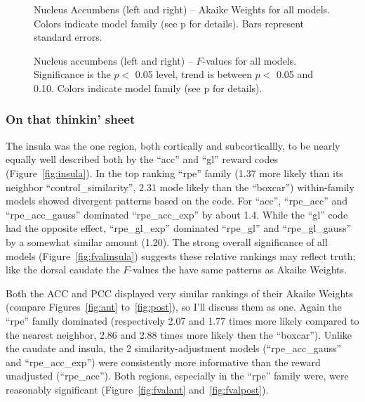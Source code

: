 \documentclass[doc,12pt]{apa}        %
\begin{document}
\begin{figure}[tp]
    \centering
    \caption{Nucleus Accumbens (left and right) -- Akaike Weights for all models.  Colors indicate model family (see p\pageref{sub:cmb} for details). Bars represent standard errors.}
	\label{fig:accumbens}
\end{figure}
\begin{figure}[tp]
    \centering
    \caption{Nucleus accumbens (left and right) -- $F$-values for all models.  Significance is the $p <$ 0.05 level, trend is between $p <$ 0.05 and 0.10.  Colors indicate model family (see p\pageref{sub:cmb} for details).}
	\label{fig:fvalaccumbens}
\end{figure}

\subsubsection{On that thinkin' sheet}
\label{subsub:onsheet}
The insula was the one region, both cortically and subcorticallly, to be nearly equally well described both by the ``acc'' and ``gl'' reward codes (Figure~\ref{fig:insula}).  In the top ranking ``rpe'' family (1.37 more likely than its neighbor ``control\_similarity'', 2.31 mode likely than the ``boxcar'') within-family models showed divergent patterns based on the code.  For ``acc'', ``rpe\_acc'' and ``rpe\_acc\_gauss'' dominated ``rpe\_acc\_exp'' by about 1.4.  While the ``gl'' code had the opposite effect, ``rpe\_gl\_exp'' dominated ``rpe\_gl'' and ``rpe\_gl\_gauss'' by a somewhat similar amount (1.20).  The strong overall significance of all models (Figure~\ref{fig:fvalinsula}) suggests these relative rankings may reflect truth; like the dorsal caudate the $F$-values the have same patterns as Akaike Weights.

Both the ACC and PCC displayed very similar rankings of their Akaike Weights (compare Figures~\ref{fig:ant} to~\ref{fig:post}), so I'll discuss them as one.  Again the ``rpe'' family dominated (respectively 2.07 and 1.77 times more likely compared to the nearest neighbor, 2.86 and 2.88 times more likely then the ``boxcar'').  Unlike the caudate and insula, the 2 similarity-adjustment models (``rpe\_acc\_gauss'' and ``rpe\_acc\_exp'') were consistently more informative than the reward unadjusted (``rpe\_acc'').  Both regions, especially in the ``rpe'' family were, were reasonably significant (Figure~\ref{fig:fvalant} and~\ref{fig:fvalpost}).
\end{document}
